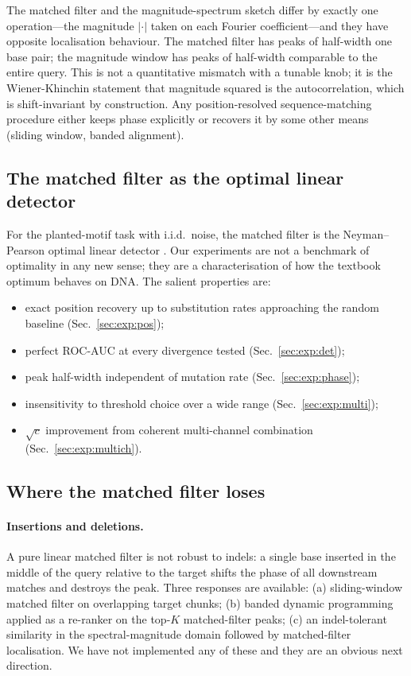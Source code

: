 \documentclass[twocolumn,11pt,a4paper]{article}
\theoremstyle{definition}
\theoremstyle{remark}
\begin{document}
The matched filter and the magnitude-spectrum sketch differ by exactly
one operation---the magnitude $|\cdot|$ taken on each Fourier
coefficient---and they have opposite localisation behaviour. The
matched filter has peaks of half-width one base pair; the magnitude
window has peaks of half-width comparable to the entire query. This is
not a quantitative mismatch with a tunable knob; it is the
Wiener-Khinchin statement that magnitude squared is the autocorrelation,
which is shift-invariant by construction. Any position-resolved
sequence-matching procedure either keeps phase explicitly or recovers
it by some other means (sliding window, banded alignment).

\subsection{The matched filter as the optimal linear detector}

For the planted-motif task with i.i.d.\ noise, the matched filter is
the Neyman--Pearson optimal linear detector \citep{neyman1933,
turin1960, kay1998}. Our experiments are not a benchmark of optimality
in any new sense; they are a characterisation of how the textbook
optimum behaves on DNA. The salient properties are:
\begin{itemize}
\item exact position recovery up to substitution rates approaching the
random baseline (Sec.~\ref{sec:exp:pos});
\item perfect ROC-AUC at every divergence tested
(Sec.~\ref{sec:exp:det});
\item peak half-width independent of mutation rate
(Sec.~\ref{sec:exp:phase});
\item insensitivity to threshold choice over a wide range
(Sec.~\ref{sec:exp:multi});
\item $\sqrt{c}$ improvement from coherent multi-channel combination
(Sec.~\ref{sec:exp:multich}).
\end{itemize}

\subsection{Where the matched filter loses}
\label{sec:discussion:limits}

\paragraph{Insertions and deletions.} A pure linear matched filter is
not robust to indels: a single base inserted in the middle of the
query relative to the target shifts the phase of all downstream
matches and destroys the peak. Three responses are available:
(a) sliding-window matched filter on overlapping target chunks;
(b) banded dynamic programming applied as a re-ranker on the top-$K$
matched-filter peaks; (c) an indel-tolerant similarity in the
spectral-magnitude domain followed by matched-filter localisation.
We have not implemented any of these and they are an obvious next
direction.
\end{document}
